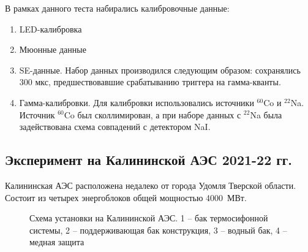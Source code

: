 \par В рамках данного теста набирались калибровочные данные:
 \begin{enumerate}
     \item LED-калибровка
     \item Мюонные данные
     \item SE-данные. Набор данных производился следующим образом: сохранялись 300 мкс, предшествовавшие срабатыванию триггера на гамма-кванты.
     \item Гамма-калибровки. Для калибровки использовались источники $^{60}$Co и $^{22}$Na. Источник $^{60}$Co был сколлимирован, а при наборе данных с $^{22}$Na была задействована схема совпадений с детектором NaI. 
 \end{enumerate}

\subsection{Эксперимент на Калининской АЭС 2021-22 гг.}
\label{subsect2_2_2}
Калининская АЭС расположена недалеко от города Удомля Тверской области. Состоит из четырех энергоблоков общей мощностью 4000~МВт. 
\begin{figure}[H]
	\caption[Схема установки на Калининской АЭС] {Схема установки на Калининской АЭС. 1 -- бак термосифонной системы, 2 -- поддерживающая бак конструкция, 3 -- водный бак, 4 -- медная защита}
	\label{img:kaesscheme}
\end{figure}

